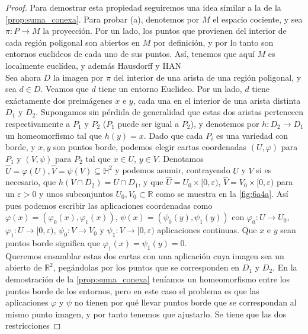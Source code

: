 \documentclass[10pt]{report}
\newcommand{\R}{\mathbb{R}}
\theoremstyle{definition}
\begin{document}
\begin{proof} 
Para demostrar esta propiedad seguiremos una idea similar a la de la \autoref{prop:suma_conexa}. Para probar (a), denotemos por $M$ el espacio cociente, y sea $\pi :P\to M$ la proyección.  %
Por un lado, los puntos que provienen del interior de cada región poligonal son abiertos en $M$ por definición, y por lo tanto son entornos euclideos de cada uno de sus puntos. Así, tenemos que aquí $M$ es localmente euclídea, y además Hausdorff y IIAN \\
Sea ahora $D$ la imagen por $\pi$ del interior de una arista de una región poligonal, y sea $d\in D$. Veamos que $d$ tiene un entorno Euclideo. Por un lado, $d$ tiene exáctamente dos preimágenes $x$ e $y$, cada una en el interior de una arista distinta $D_1$ y $D_2$. Supongamos sin pérdida de generalidad que estas dos aristas pertenecen respectivamente a $P_1$ y $P_2$ ($P_1$ puede ser igual a $P_2$), y denotemos por $h:D_2\to D_1$ un homeomorfismo tal que $h(y)=x$. Dado que cada $P_i$ es una variedad con borde, y $x,y$ son puntos borde, podemos elegir cartas coordenadas $(U,\varphi)$  para $P_1$ y $(V,\psi)$ para $P_2$ tal que $x\in U$, $y\in V$. Denotamos $\widehat{U}=\varphi(U),\widehat{V}=\psi(V)\subseteq \mathbb{H}^2$ y podemos asumir, contrayendo $U$ y $V$ si es necesario, que $h(V\cap D_2)=U\cap D_1$, y que $\widehat{U}=U_0\times [0,\varepsilon)$, $\widehat{V}=V_0\times [0,\varepsilon)$  para un $\varepsilon >0$ y unos subconjuntos $U_0, V_0 \subset \R$ como se muestra en la \autoref{fig:6a4a}. Así pues podemos escribir las aplicaciones coordenadas como $\varphi(x)=(\varphi_0(x),\varphi_1(x))$, $\psi(x)=(\psi_0(y),\psi_1(y))$ con $\varphi_0:U\to U_0$, $\varphi_1:U\to [0,\varepsilon)$, $\psi_0:V\to V_0$ y $\psi_1:V\to [0,\varepsilon)$ aplicaciones continuas. Que $x$ e $y$ sean puntos borde significa que $\varphi_1(x)=\psi_1(y)=0$.\\
Queremos ensamblar estas dos cartas con una aplicación cuya imagen sea un abierto de $\R^2$, pegándolas por los puntos que se corresponden en $D_1$ y $D_2$. En la demostración de la \autoref{prop:suma_conexa} teníamos un homeomorfismo entre los puntos borde de los entornos, pero en este caso el problema es que las aplicaciones $\varphi$ y $\psi$ no tienen por qué llevar puntos borde que se correspondan al mismo punto imagen, y por tanto tenemos que ajustarlo. Se tiene que las dos restricciones 

\end{proof}
\end{document}
